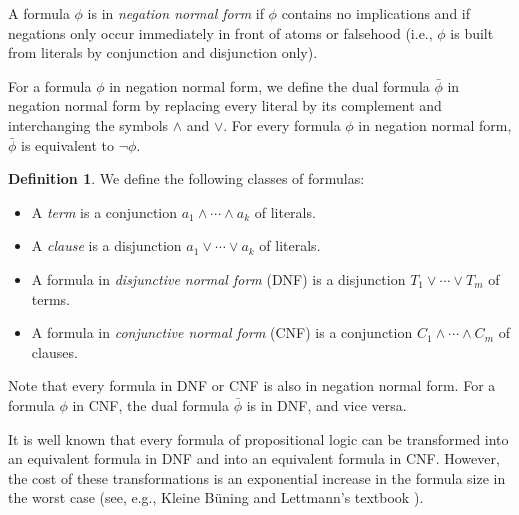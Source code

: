 \documentclass[a4paper,USenglish,cleveref, autoref, thm-restate]{lipics-v2021}
\theoremstyle{definition}
\newtheorem{definitionx}[theorem]{Definition}
\begin{document}
A formula $\phi$ is in \emph{negation normal form} if $\phi$ contains no implications and if negations only occur immediately in front of atoms or falsehood
(i.e., $\phi$ is built from literals by conjunction and disjunction only).

For a formula $\phi$ in negation normal form, we define the dual formula
$\bar{\phi}$ in negation normal form by replacing every literal by its
complement and interchanging the symbols $\land$ and $\lor$.
For every formula $\phi$ in negation normal form, $\bar{\phi}$ is equivalent to $\neg \phi$.

\begin{definitionx}
  We define the following classes of formulas:
\begin{itemize}
\item A \emph{term} is a conjunction $a_1 \land \cdots \land a_k$
  of literals.
\item A \emph{clause} is a disjunction $a_1 \lor \cdots \lor a_k$ of literals.
\item A formula in \emph{disjunctive normal form} (DNF) is a
  disjunction $T_1 \lor \cdots \lor T_m$ of terms.
\item A formula in \emph{conjunctive normal form} (CNF) is a
  conjunction $C_1 \land \cdots \land C_m$ of clauses.
\end{itemize}
\end{definitionx}

Note that every formula in DNF or CNF is also in negation normal form.
For a formula $\phi$ in CNF, the dual formula $\bar \phi$ is in DNF, and vice versa.

It is well known that every formula of propositional logic can be transformed
into an equivalent formula in DNF and
into an equivalent formula in CNF.
However, the cost of these transformations is an
exponential increase in the formula size in the worst case (see, e.g., Kleine B\"uning and Lettmann's textbook \cite{KleineBueningLettmann_Aussagenlogik}).
\end{document}
